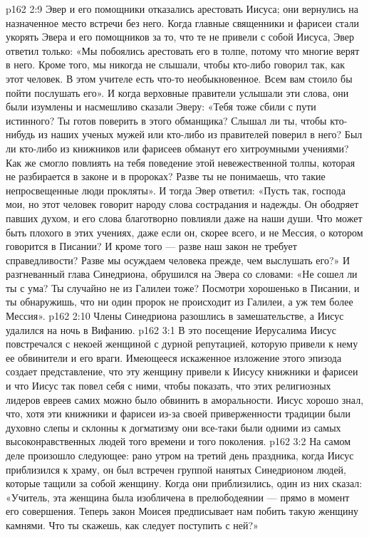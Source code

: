\vs p162 2:9 Эвер и его помощники отказались арестовать Иисуса; они вернулись на назначенное место встречи без него. Когда главные священники и фарисеи стали укорять Эвера и его помощников за то, что те не привели с собой Иисуса, Эвер ответил только: «Мы побоялись арестовать его в толпе, потому что многие верят в него. Кроме того, мы никогда не слышали, чтобы кто\hyp{}либо говорил так, как этот человек. В этом учителе есть что\hyp{}то необыкновенное. Всем вам стоило бы пойти послушать его». И когда верховные правители услышали эти слова, они были изумлены и насмешливо сказали Эверу: «Тебя тоже сбили с пути истинного? Ты готов поверить в этого обманщика? Слышал ли ты, чтобы кто\hyp{}нибудь из наших ученых мужей или кто\hyp{}либо из правителей поверил в него? Был ли кто\hyp{}либо из книжников или фарисеев обманут его хитроумными учениями? Как же смогло повлиять на тебя поведение этой невежественной толпы, которая не разбирается в законе и в пророках? Разве ты не понимаешь, что такие непросвещенные люди прокляты». И тогда Эвер ответил: «Пусть так, господа мои, но этот человек говорит народу слова сострадания и надежды. Он ободряет павших духом, и его слова благотворно повлияли даже на наши души. Что может быть плохого в этих учениях, даже если он, скорее всего, и не Мессия, о котором говорится в Писании? И кроме того --- разве наш закон не требует справедливости? Разве мы осуждаем человека прежде, чем выслушать его?» И разгневанный глава Синедриона, обрушился на Эвера со словами: «Не сошел ли ты с ума? Ты случайно не из Галилеи тоже? Посмотри хорошенько в Писании, и ты обнаружишь, что ни один пророк не происходит из Галилеи, а уж тем более Мессия».
\vs p162 2:10 Члены Синедриона разошлись в замешательстве, а Иисус удалился на ночь в Вифанию.
\vs p162 3:1 В это посещение Иерусалима Иисус повстречался с некоей женщиной с дурной репутацией, которую привели к нему ее обвинители и его враги. Имеющееся искаженное изложение этого эпизода создает представление, что эту женщину привели к Иисусу книжники и фарисеи и что Иисус так повел себя с ними, чтобы показать, что этих религиозных лидеров евреев самих можно было обвинить в аморальности. Иисус хорошо знал, что, хотя эти книжники и фарисеи из\hyp{}за своей приверженности традиции были духовно слепы и склонны к догматизму они все\hyp{}таки были одними из самых высоконравственных людей того времени и того поколения.
\vs p162 3:2 На самом деле произошло следующее: рано утром на третий день праздника, когда Иисус приблизился к храму, он был встречен группой нанятых Синедрионом людей, которые тащили за собой женщину. Когда они приблизились, один из них сказал: «Учитель, эта женщина была изобличена в прелюбодеянии --- прямо в момент его совершения. Теперь закон Моисея предписывает нам побить такую женщину камнями. Что ты скажешь, как следует поступить с ней?»
